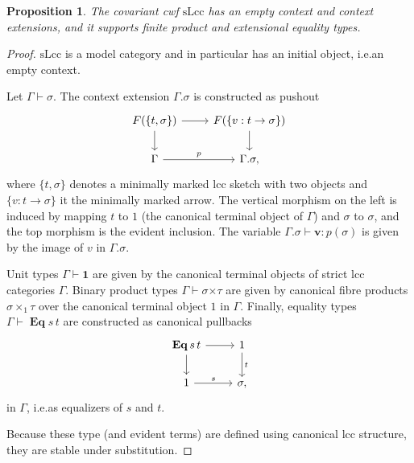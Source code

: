 \documentclass[a4paper]{article}
\newtheorem{proposition}[theorem]{Proposition}
\theoremstyle{remark}
\theoremstyle{definition}
\begin{document}
\begin{proposition}
  \label{prop:slcc-model}
  The covariant cwf $\mathrm{sLcc}$ has an empty context and context extensions, and it supports finite product and extensional equality types.
\end{proposition}
\begin{proof}
  $\mathrm{sLcc}$ is a model category and in particular has an initial object, i.e.\@ an empty context.
  
  Let $\Gamma \vdash \sigma$.
  The context extension $\Gamma.\sigma$ is constructed as pushout
  \begin{equation}
    \label{eq:slcc-context-extension}
    \begin{tikzcd}
      F(\{ t, \sigma \}) \arrow[d] \arrow[r] & F(\{ v : t \rightarrow \sigma \}) \arrow[d] \\
      \Gamma \arrow[r, "p"] & \Gamma.\sigma,
    \end{tikzcd}
  \end{equation}
  where $\{ t, \sigma \}$ denotes a minimally marked lcc sketch with two objects and $\{ v : t \rightarrow \sigma \}$ it the minimally marked arrow.
  The vertical morphism on the left is induced by mapping $t$ to $1$ (the canonical terminal object of $\Gamma$) and $\sigma$ to $\sigma$, and the top morphism is the evident inclusion.
  The variable $\Gamma.\sigma \vdash \mathbf{v} : p(\sigma)$ is given by the image of $v$ in $\Gamma.\sigma$.

  Unit types $\Gamma \vdash \mathbf{1}$ are given by the canonical terminal objects of strict lcc categories $\Gamma$.
  Binary product types $\Gamma \vdash \sigma \mathbin{\mathbf{\times}} \tau$ are given by canonical fibre products $\sigma \times_1 \tau$ over the canonical terminal object $1$ in $\Gamma$.
  Finally, equality types $\Gamma \vdash \operatorname{\mathbf{Eq}} s \, t$ are constructed as canonical pullbacks
  \begin{equation}
    \begin{tikzcd}
      \operatorname{\mathbf{Eq}} s \, t \arrow[r] \arrow[d] & 1 \arrow[d, "t"] \\
      1 \arrow[r, "s"] & \sigma,
    \end{tikzcd}
  \end{equation}
  in $\Gamma$, i.e.\@ as equalizers of $s$ and $t$.

  Because these type (and evident terms) are defined using canonical lcc structure, they are stable under substitution.
\end{proof}
\end{document}
